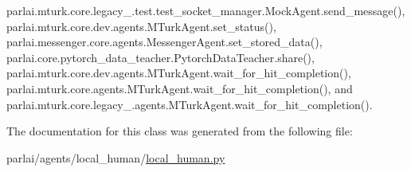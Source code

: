 parlai.\+mturk.\+core.\+legacy\+\_.\+test.\+test\+\_\+socket\+\_\+manager.\+Mock\+Agent.\+send\+\_\+message(), parlai.\+mturk.\+core.\+dev.\+agents.\+M\+Turk\+Agent.\+set\+\_\+status(), parlai.\+messenger.\+core.\+agents.\+Messenger\+Agent.\+set\+\_\+stored\+\_\+data(), parlai.\+core.\+pytorch\+\_\+data\+\_\+teacher.\+Pytorch\+Data\+Teacher.\+share(), parlai.\+mturk.\+core.\+dev.\+agents.\+M\+Turk\+Agent.\+wait\+\_\+for\+\_\+hit\+\_\+completion(), parlai.\+mturk.\+core.\+agents.\+M\+Turk\+Agent.\+wait\+\_\+for\+\_\+hit\+\_\+completion(), and parlai.\+mturk.\+core.\+legacy\+\_.\+agents.\+M\+Turk\+Agent.\+wait\+\_\+for\+\_\+hit\+\_\+completion().



The documentation for this class was generated from the following file\+:\begin{DoxyCompactItemize}
\item 
parlai/agents/local\+\_\+human/\hyperlink{local__human_8py}{local\+\_\+human.\+py}\end{DoxyCompactItemize}
